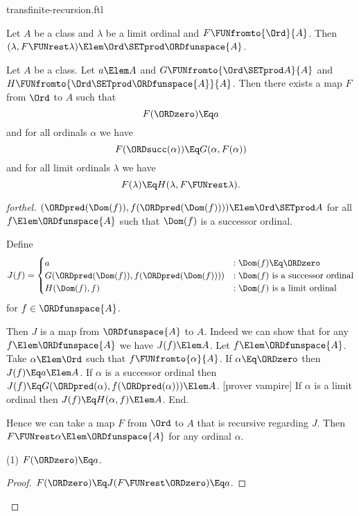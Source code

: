 \documentclass{stex}
\begin{document}
\begin{smodule}{transfinite-recursion.ftl}
\begin{lemma}[forthel,id=transfinite_recursion_570293857449281]
  Let $A$ be a class and $\lambda$ be a limit ordinal and $F \FUNfromto{\Ord}{A}$.
  Then $(\lambda, F \FUNrest \lambda) \Elem \Ord \SETprod \ORDfunspace{A}$.
\end{lemma}

\begin{corollary}[forthel,id=transfinite_recursion_298647309184593]
  Let $A$ be a class.
  Let $a \Elem A$ and $G \FUNfromto{\Ord \SETprod A}{A}$ and $H \FUNfromto{\Ord \SETprod \ORDfunspace{A}}{A}$.
  Then there exists a map $F$ from $\Ord$ to $A$ such that
  \[ F(\ORDzero) \Eq a \]
  and for all ordinals $\alpha$ we have
  \[ F(\ORDsucc(\alpha)) \Eq G(\alpha, F(\alpha)) \]
  and for all limit ordinals $\lambda$ we have
  \[ F(\lambda) \Eq H(\lambda, F \FUNrest \lambda). \]
\end{corollary}
\begin{proof}[forthel]
  $(\ORDpred(\Dom(f)), f(\ORDpred(\Dom(f)))) \Elem \Ord \SETprod A$ for all $f \Elem \ORDfunspace{A}$ such that $\Dom(f)$ is a successor ordinal.

  Define  \[ J(f) =
    \begin{cases}
      a
      & : \Dom(f) \Eq \ORDzero
      \\
      G(\ORDpred(\Dom(f)), f(\ORDpred(\Dom(f))))
      & : \text{$\Dom(f)$ is a successor ordinal}
      \\
      H(\Dom(f), f)
      & : \text{$\Dom(f)$ is a limit ordinal}
    \end{cases} \]
  for $f \in \ORDfunspace{A}$.

  Then $J$ is a map from $\ORDfunspace{A}$ to $A$.
  Indeed we can show that for any $f \Elem \ORDfunspace{A}$ we have $J(f) \Elem A$.
    Let $f \Elem \ORDfunspace{A}$.
    Take $\alpha \Elem \Ord$ such that $f \FUNfromto{\alpha}{A}$.
    If $\alpha \Eq \ORDzero$ then $J(f) \Eq a \Elem A$.
    If $\alpha$ is a successor ordinal then $J(f) \Eq
    G(\ORDpred(\alpha), f(\ORDpred(\alpha))) \Elem A$.
    [prover vampire]
    If $\alpha$ is a limit ordinal then $J(f) \Eq H(\alpha, f) \Elem A$.
  End.

  Hence we can take a map $F$ from $\Ord$ to $A$ that is recursive regarding $J$.
  Then $F \FUNrest \alpha \Elem \ORDfunspace{A}$ for any ordinal $\alpha$.

  (1) $F(\ORDzero) \Eq a$.
  \begin{proof}
    $F(\ORDzero)
      \Eq J(F \FUNrest \ORDzero)
      \Eq a$.
  \end{proof}


\end{proof}
\end{smodule}
\end{document}
